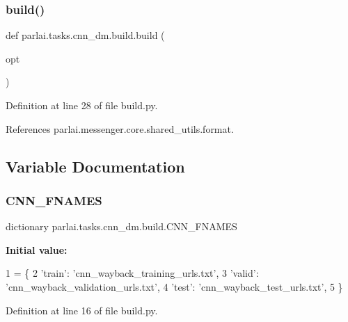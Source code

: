 \subsubsection{\texorpdfstring{build()}{build()}}
{\footnotesize\ttfamily def parlai.\+tasks.\+cnn\+\_\+dm.\+build.\+build (\begin{DoxyParamCaption}\item[{}]{opt }\end{DoxyParamCaption})}



Definition at line 28 of file build.\+py.



References parlai.\+messenger.\+core.\+shared\+\_\+utils.\+format.



\subsection{Variable Documentation}
\mbox{\label{namespaceparlai_1_1tasks_1_1cnn__dm_1_1build_ad1f00c164bf130900f5ccd059e6c8118}} 
\subsubsection{\texorpdfstring{C\+N\+N\+\_\+\+F\+N\+A\+M\+ES}{CNN\_FNAMES}}
{\footnotesize\ttfamily dictionary parlai.\+tasks.\+cnn\+\_\+dm.\+build.\+C\+N\+N\+\_\+\+F\+N\+A\+M\+ES}

{\bfseries Initial value\+:}
\begin{DoxyCode}
1 =  \{
2     \textcolor{stringliteral}{'train'}: \textcolor{stringliteral}{'cnn\_wayback\_training\_urls.txt'},
3     \textcolor{stringliteral}{'valid'}: \textcolor{stringliteral}{'cnn\_wayback\_validation\_urls.txt'},
4     \textcolor{stringliteral}{'test'}: \textcolor{stringliteral}{'cnn\_wayback\_test\_urls.txt'},
5 \}
\end{DoxyCode}


Definition at line 16 of file build.\+py.

\mbox{\label{namespaceparlai_1_1tasks_1_1cnn__dm_1_1build_af43cab2a5e95e7d1e8373c69aa35086e}} 
